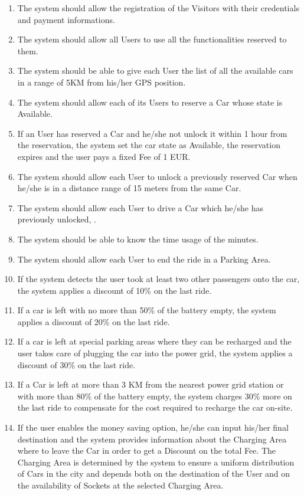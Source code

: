 \begin{enumerate}
	\item The system should allow the registration of the Visitors with their credentials and payment informations.
	\item The system should allow all Users to use all the functionalities reserved to them.
	\item The system should be able to give each User the list of all the available cars in a range of 5KM from his/her GPS position.
	\item The system should allow each of its Users to reserve a Car whose state is Available.
	\item If an User has reserved a Car and he/she not unlock it within 1 hour from the reservation, the system set the car state as Available, the reservation expires and the user pays a fixed Fee of 1 EUR.  
	\item The system should allow each User to unlock a previously reserved Car when he/she is in a distance range of 15 meters from the same Car.
	\item The system should allow each User to drive a Car which he/she has previously unlocked, .
	\item The system should be able to know the time usage of the minutes.
	\item The system should allow each User to end the ride in a Parking Area.
	\item If the system detects the user took at least two other passengers onto the car, the system applies a discount of 10\% on the last ride. 
	\item If a car is left with no more than 50\% of the battery empty, the system applies a discount of 20\% on the last ride. 
	\item If a car is left at special parking areas where they can be recharged and the user takes care of plugging the car into the power grid, the system applies a discount of 30\% on the last ride. 
	\item If a Car is left at more than 3 KM from the nearest power grid station or with more than 80\% of the battery empty, the system charges 30\% more on the last ride to compensate for the cost required to recharge the car on-site.
	\item If the user enables the money saving option, he/she can input his/her final destination and the system provides information about the Charging Area where to leave the Car in order to get a Discount on the total Fee. The Charging Area is determined by the system to ensure a uniform distribution of Cars in the city and depends both on the destination of the User and on the availability of Sockets at the selected Charging Area. 
\end{enumerate}


